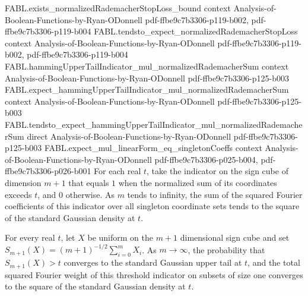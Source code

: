 \begin{theorem}
\proofstep
  {FABL.exists_normalizedRademacherStopLoss_bound}
  {context}
  {Analysis-of-Boolean-Functions-by-Ryan-ODonnell}
  {pdf-ffbe9c7b3306-p119-b002,
    pdf-ffbe9c7b3306-p119-b004}
\proofstep
  {FABL.tendsto_expect_normalizedRademacherStopLoss}
  {context}
  {Analysis-of-Boolean-Functions-by-Ryan-ODonnell}
  {pdf-ffbe9c7b3306-p119-b002,
    pdf-ffbe9c7b3306-p119-b004}
\proofstep
  {FABL.hammingUpperTailIndicator_mul_normalizedRademacherSum}
  {context}
  {Analysis-of-Boolean-Functions-by-Ryan-ODonnell}
  {pdf-ffbe9c7b3306-p125-b003}
\proofstep
  {FABL.expect_hammingUpperTailIndicator_mul_normalizedRademacherSum}
  {context}
  {Analysis-of-Boolean-Functions-by-Ryan-ODonnell}
  {pdf-ffbe9c7b3306-p125-b003}
\proofstep
  {FABL.tendsto_expect_hammingUpperTailIndicator_mul_normalizedRademacherSum}
  {direct}
  {Analysis-of-Boolean-Functions-by-Ryan-ODonnell}
  {pdf-ffbe9c7b3306-p125-b003}
\proofstep
  {FABL.expect_mul_linearForm_eq_singletonCoeffs}
  {context}
  {Analysis-of-Boolean-Functions-by-Ryan-ODonnell}
  {pdf-ffbe9c7b3306-p025-b004,
    pdf-ffbe9c7b3306-p026-b001}
For each real $t$, take the indicator on the sign cube of dimension $m+1$ that equals
$1$ when the normalized sum of its coordinates exceeds $t$, and $0$ otherwise. As $m$
tends to infinity, the sum of the squared Fourier coefficients of this indicator over
all singleton coordinate sets tends to the square of the standard Gaussian density at
$t$.
\end{theorem}

\begin{theorem}
\label{FABL.proposition5_25}
\leanok
{}
For every real $t$, let $X$ be uniform on the $m+1$ dimensional sign cube and set
$S_{m+1}(X)=(m+1)^{-1/2}\sum_{i=0}^{m}X_i$. As $m\to\infty$, the probability that
$S_{m+1}(X)>t$ converges to the standard Gaussian upper tail at $t$, and the total
squared Fourier weight of this threshold indicator on subsets of size one converges to
the square of the standard Gaussian density at $t$.
\end{theorem}
